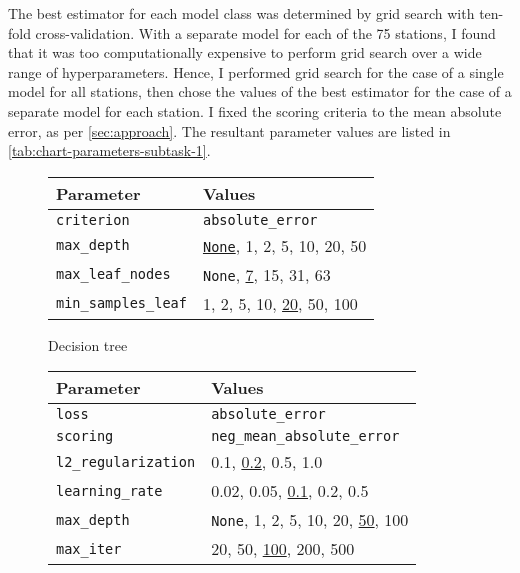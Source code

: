 \documentclass[11pt]{extarticle}
\newcommand{\None}{\texttt{None}}
\newcommand{\subfigurespace}{\par\bigskip\bigskip}
\begin{document}
The best estimator for each model class was determined by grid search with ten-fold
cross-validation.
With a separate model for each of the 75 stations, I found that it was too
computationally expensive to perform grid search over a wide range of hyperparameters.
Hence, I performed grid search for the case of a single model for all stations, then
chose the values of the best estimator for the case of a separate model for each
station.
I fixed the scoring criteria to the mean absolute error, as per \cref{sec:approach}.
The resultant parameter values are listed in \cref{tab:chart-parameters-subtask-1}.

\begin{table}
  \centering
  \begin{subfigure}{\textwidth}
    \centering
    \begin{tabular}{ll}
      \toprule
      Parameter                   & Values
      \\
      \midrule
      \texttt{criterion}          & \texttt{absolute\_error}
      \\
      \midrule
      \texttt{max\_depth}         & \underline{\None}, 1, 2, 5, 10, 20, 50
      \\
      \texttt{max\_leaf\_nodes}   & \None, \underline{7}, 15, 31, 63
      \\
      \texttt{min\_samples\_leaf} & 1, 2, 5, 10, \underline{20}, 50, 100
      \\
      \bottomrule
    \end{tabular}
    \caption{Decision tree}
    \label{tab:chart-parameters-subtask-1-1}
  \end{subfigure}
  \subfigurespace
  \begin{subfigure}{\textwidth}
    \centering
    \begin{tabular}{ll}
      \toprule
      Parameter                   & Values
      \\
      \midrule
      \texttt{loss}               & \texttt{absolute\_error}
      \\
      \texttt{scoring}            & \texttt{neg\_mean\_absolute\_error}
      \\
      \midrule
      \texttt{l2\_regularization} & 0.1, \underline{0.2}, 0.5, 1.0
      \\
      \texttt{learning\_rate}     & 0.02, 0.05, \underline{0.1}, 0.2, 0.5
      \\
      \texttt{max\_depth}         & \None, 1, 2, 5, 10, 20, \underline{50}, 100
      \\
      \texttt{max\_iter}          & 20, 50, \underline{100}, 200, 500

\end{tabular}
\end{subfigure}
\end{table}
\end{document}
